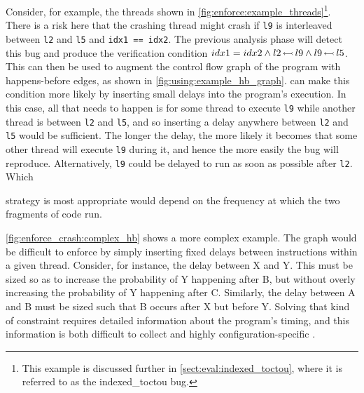 Consider, for example, the threads shown in
\autoref{fig:enforce:example_threads}\footnote{This example is
  discussed further in \autoref{sect:eval:indexed_toctou}, where it is
  referred to as the indexed\_toctou bug.}.  There is a risk here that
the crashing thread might crash if \verb|l9| is interleaved between
\verb|l2| and \verb|l5| and \verb|idx1 == idx2|.  The previous
analysis phase will detect this bug and produce the verification
condition $idx1 = idx2 \wedge l2\,{\leftarrowtail}\,l9 \wedge
l9\,{\leftarrowtail}\,l5$.  This can then be used to augment the control
flow graph of the program with happens-before edges, as shown in
\autoref{fig:using:example_hb_graph}.  {\Technique} can make this
condition more likely by inserting small delays into the program's
execution.  In this case, all that needs to happen is for some thread
to execute \texttt{l9} while another thread is between \texttt{l2} and
\texttt{l5}, and so inserting a delay anywhere between \texttt{l2} and
\texttt{l5} would be sufficient.  The longer the delay, the more
likely it becomes that some other thread will execute \texttt{l9}
during it, and hence the more easily the bug will reproduce.
Alternatively, \texttt{l9} could be delayed to run as soon as possible
after \texttt{l2}.  Which
strategy is most appropriate would depend on the frequency at which
the two fragments of code run.

\autoref{fig:enforce_crash:complex_hb} shows a more complex
example.  The graph would be difficult to enforce by simply inserting
fixed delays between instructions within a given thread.  Consider,
for instance, the delay between X and Y.  This must be sized so as to
increase the probability of Y happening after B, but without overly
increasing the probability of Y happening
after C.  Similarly, the delay between A and B must be sized such that
B occurs after X but before Y.  Solving that kind of constraint
requires detailed information about the program's timing, and this
information is both difficult to collect and highly
configuration-specific .

